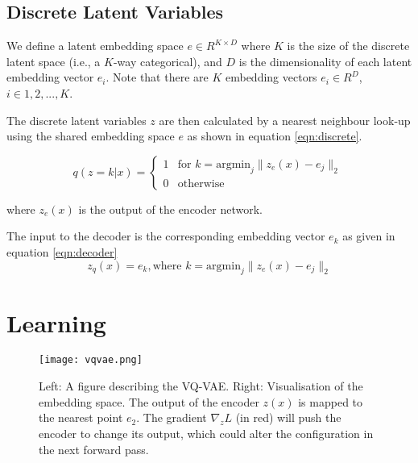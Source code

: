  \subsection{Discrete Latent Variables}
 We define a latent embedding space $e \in R^{K \times D}$ where $K$ is the size of the discrete latent space 
 (i.e., a $K$-way categorical), and $D$ is the dimensionality of each latent embedding vector $e_{i}$.
 Note that there are $K$ embedding vectors $e_{i} \in R ^D$, $i\in{1, 2, ..., K}$.

 The discrete latent variables $z$ are then calculated by a nearest 
 neighbour look-up using the shared embedding space $e$ as shown in equation \ref{eqn:discrete}.

 \begin{equation}
    q(z = k|x) =
    \begin{cases}
        1 & \text{for } k = \text{argmin}_{j} \| z_{e}(x) - e_{j} \|_{2} \\
        0 & \text{otherwise}
    \end{cases}
    \label{eqn:discrete}
 \end{equation} 

 where $z _e(x)$ is the output of the encoder network.

 The input to the decoder is the corresponding embedding vector $e _k$ as given in equation \ref{eqn:decoder}
 \begin{equation}
     z _q(x) = e _k, \text{where } k= \text{argmin} _j \| z _e(x) - e _j \| _2
     \label{eqn:decoder}
 \end{equation}

\section{Learning}

\begin{figure}[h]
    \begin{center}
        \texttt{[image: vqvae.png]}
    \end{center}
    \caption{Left: A figure describing the VQ-VAE. Right: Visualisation of the embedding space. The
    output of the encoder $z(x)$ is mapped to the nearest point $e _2$. The gradient $\nabla _z L$ (in red) will push the
    encoder to change its output, which could alter the configuration in the next forward pass.}
\end{figure}










